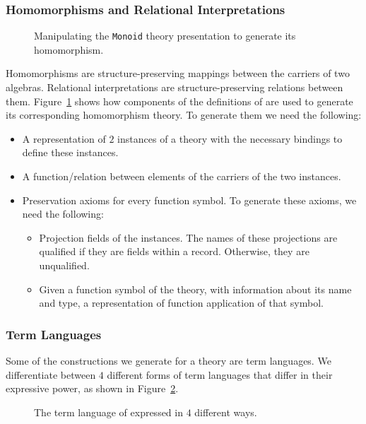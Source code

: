 \subsubsection{Homomorphisms and Relational Interpretations}
\begin{figure}

\caption{Manipulating the \lstinline|Monoid| theory presentation to generate its homomorphism.}
\label{fig:monoid-hom-rel}
\end{figure}

Homomorphisms are structure-preserving mappings between the carriers of two algebras. Relational interpretations are structure-preserving relations between them. Figure~\ref{fig:monoid-hom-rel} shows how components of the definitions of  are used to generate its corresponding homomorphism theory. To generate them we need the following: 
\begin{itemize}
\item A representation of $2$ instances of a theory with the necessary bindings to define these instances.  
\item A function/relation between elements of the carriers of the two instances. 
\item Preservation axioms for every function symbol. To generate these axioms, we need the following:  
    \begin{itemize}
    \item Projection fields of the instances. The names of these projections are qualified if they are fields within a record. Otherwise, they are unqualified.   
    \item Given a function symbol of the theory, with information about its name and type, a representation of function application of that symbol.  
    \end{itemize}
\end{itemize}

\subsubsection{Term Languages}
Some of the constructions we generate for a theory are term languages. 
We differentiate between $4$ different forms of term languages that differ in their expressive power, as shown in Figure~\ref{fig:term-lang-4-forms}. 
\begin{figure}
    
    \caption{The term language of  expressed in $4$ different ways.}
    \label{fig:term-lang-4-forms}
\end{figure}

